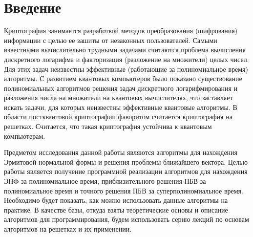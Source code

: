 \newpage

\section{Введение}

Криптография занимается разработкой методов преобразования (шифрования) информации с целью ее зашиты от незаконных пользователей. Самыми известными вычислительно трудными задачами считаются проблема вычисления дискретного логарифма и факторизация (разложение на множители) целых чисел. Для этих задач неизвестны эффективные (работающие за полиномиальное время) алгоритмы. С развитием квантовых компьютеров было показано существование полиномиальных алгоритмов решения задач дискретного логарифмирования и разложения числа на множители на квантовых вычислителях, что заставляет искать задачи, для которых неизвестны эффективные квантовые алгоритмы. В области постквантовой криптографии фаворитом считается криптография на решетках. Считается, что такая криптография устойчива к квантовым компьютерам.

Предметом исследования данной работы являются алгоритмы для нахождения Эрмитовой нормальной формы и решения проблемы ближайшего вектора. Целью работы является получение программной реализации алгоритмов для нахождения ЭНФ за полиномиальное время, приблизительного решения ПБВ за полиномиальное время и точного решения ПБВ за суперполиномиальное время. Необходимо будет показать, как можно использовать данные алгоритмы на практике. В качестве базы, откуда взяты теоретические основы и описание алгоритмов для программирования, будем использовать серию лекций по основам алгоритмов на решетках и их применении.


\clearpage

